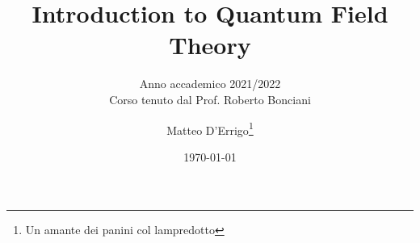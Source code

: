\documentclass[
	fontsize=10pt, %
	twoside=false, %
	numbers=noenddot, %
]{kaobook}
\begin{document}

\subject{Appunti del corso di}

\title[Introduction to Quantum Field Theory]{Introduction to Quantum Field Theory}
\subtitle{Anno accademico 2021/2022\\Corso tenuto dal Prof. Roberto Bonciani}

\author{Matteo D'Errigo\thanks{Un amante dei panini col lampredotto}}

\date{\today}



\frontmatter %




\makeatletter
\uppertitleback{\@titlehead} %
\end{document}
